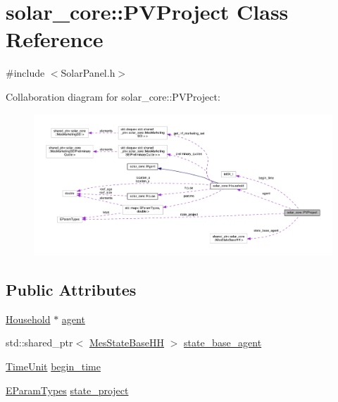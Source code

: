 \hypertarget{classsolar__core_1_1_p_v_project}{}\section{solar\+\_\+core\+:\+:P\+V\+Project Class Reference}
\label{classsolar__core_1_1_p_v_project}


{\ttfamily \#include $<$Solar\+Panel.\+h$>$}



Collaboration diagram for solar\+\_\+core\+:\+:P\+V\+Project\+:
\nopagebreak
\begin{figure}[H]
\begin{center}
\leavevmode
\includegraphics[width=350pt]{classsolar__core_1_1_p_v_project__coll__graph}
\end{center}
\end{figure}
\subsection*{Public Attributes}
\begin{DoxyCompactItemize}
\item 
\hyperlink{classsolar__core_1_1_household}{Household} $\ast$ \hyperlink{classsolar__core_1_1_p_v_project_a20e8115154979d2f856f1acceb6bb2b1}{agent}
\item 
std\+::shared\+\_\+ptr$<$ \hyperlink{classsolar__core_1_1_mes_state_base_h_h}{Mes\+State\+Base\+H\+H} $>$ \hyperlink{classsolar__core_1_1_p_v_project_a1a3576ddac7b82f9a2d7c139af9850d2}{state\+\_\+base\+\_\+agent}
\item 
\hyperlink{namespacesolar__core_a4b5949d07259da6f8a20d12a30403e90}{Time\+Unit} \hyperlink{classsolar__core_1_1_p_v_project_a5b8869c2a2580e5183a7796580074555}{begin\+\_\+time}
\item 
\hyperlink{namespacesolar__core_aa1147341e5ef7a40d68d1bd68e149362}{E\+Param\+Types} \hyperlink{classsolar__core_1_1_p_v_project_ab25a22c1202f2314a55dc9a759922183}{state\+\_\+project}
\end{DoxyCompactItemize}



